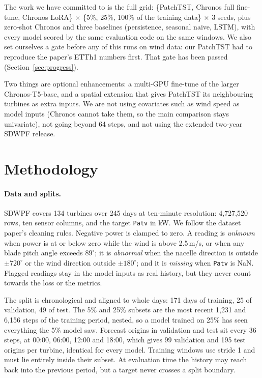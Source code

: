 \documentclass[11pt]{article}
\newcommand{\code}[1]{\texttt{\small #1}}
\begin{document}
The work we have committed to is the full grid: \{PatchTST, Chronos full fine-tune, Chronos LoRA\} $\times$
\{5\%, 25\%, 100\% of the training data\} $\times$ 3 seeds, plus zero-shot Chronos and three baselines
(persistence, seasonal naive, LSTM), with every model scored by the same evaluation code on the same windows. We
also set ourselves a gate before any of this runs on wind data: our PatchTST had to reproduce the paper's ETTh1
numbers first. That gate has been passed (Section~\ref{sec:progress}).

Two things are optional enhancements: a multi-GPU fine-tune of the larger Chronos-T5-base, and a
spatial extension that gives PatchTST its neighbouring turbines as extra inputs. We are not using covariates such
as wind speed as model inputs (Chronos cannot take them, so the main comparison stays univariate), not going beyond
64 steps, and not using the extended two-year SDWPF release.

\section{Methodology}

\paragraph{Data and splits.} SDWPF \cite{zhou2024sdwpf} covers 134 turbines over 245 days at ten-minute
resolution: 4,727,520 rows, ten sensor columns, and the target \code{Patv} in kW. We follow the dataset paper's
cleaning rules. Negative power is clamped to zero. A reading is \emph{unknown} when power is at or below zero while
the wind is above 2.5\,m/s, or when any blade pitch angle exceeds $89^\circ$; it is \emph{abnormal} when the nacelle
direction is outside $\pm720^\circ$ or the wind direction outside $\pm180^\circ$; and it is \emph{missing} when
\code{Patv} is NaN. Flagged readings stay in the model inputs as real history, but they never count towards the
loss or the metrics.

The split is chronological and aligned to whole days: 171 days of training, 25 of validation, 49 of test. The 5\%
and 25\% subsets are the most recent 1,231 and 6,156 steps of the training period, nested, so a model trained on
25\% has seen everything the 5\% model saw. Forecast origins in validation and test sit every 36 steps, at 00:00,
06:00, 12:00 and 18:00, which gives 99 validation and 195 test origins per turbine, identical for every model.
Training windows use stride 1 and must lie entirely inside their subset. At evaluation time the history may reach
back into the previous period, but a target never crosses a split boundary.
\end{document}
